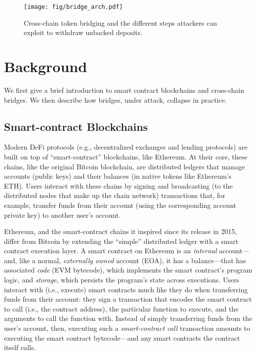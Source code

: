 \begin{figure}[h]
\centering
\texttt{[image: fig/bridge\_arch.pdf]}
\caption{Cross-chain token bridging and the different steps attackers can exploit to withdraw unbacked deposits.}
\label{fig:cross-chain}
\end{figure}

\section{Background}
\label{sec:background}
We first give a brief introduction to smart contract blockchains
and cross-chain bridges. We then describe how bridges, under attack, collapse in
practice.

\subsection{Smart-contract Blockchains} Modern DeFi protocols (e.g.,
decentralized exchanges and lending protocols) are built on top
of ``smart-contract'' blockchains, like Ethereum. At their core, these chains, like
the original Bitcoin blockchain, are distributed ledgers that manage accounts
(public keys) and their balances (in native tokens like Ethereum's ETH). Users
interact with these chains by signing and broadcasting (to the distributed nodes
that make up the chain network) transactions that, for example, transfer
funds from their account (using the corresponding account private key) to
another user's account.

Ethereum, and the smart-contract chains it inspired since its release in 2015,
differ from Bitcoin by extending the ``simple'' distributed ledger with a smart
contract execution layer. A smart contract on Ethereum is an \emph{internal}
account---and, like a normal, \emph{externally owned} account (EOA), it has a
balance---that has associated \emph{code} (EVM bytecode), which implements the
smart contract's program logic, and \emph{storage}, which persists the program's
state across executions. Users interact with (i.e., execute) smart contracts
much like they do when transferring funds from their account: they sign a
transaction that encodes the smart contract to call (i.e., the contract address),
the particular function to execute, and the arguments to call the function with.
Instead of simply transferring funds from the user's account, then, executing
such a \emph{smart-contract call} transaction amounts to executing the smart
contract bytecode---and any smart contracts the contract itself calls.
    
